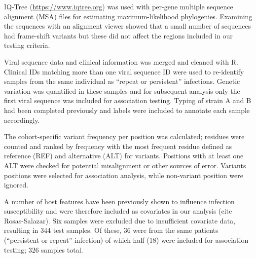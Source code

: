 \documentclass{article}
\begin{document}
IQ-Tree 
(\url{https://www.iqtree.org})
\cite{nguyen2015iq}
was used with per-gene multiple sequence alignment (MSA) files for estimating maximum-likelihood phylogenies.
Examining the sequences with an alignment viewer showed that a small number of sequences had frame-shift variants but these did not affect the regions included in our testing criteria.

Viral sequence data and clinical information was merged and cleaned with R.
Clinical IDs matching more than one viral sequence ID were used to re-identify samples from the same individual as ``repeat or persistent'' infections. 
Genetic variation was quantified in these samples and for subsequent analysis only the first viral sequence was included for association testing. 
Typing of strain A and B had been completed previously and labels were included to annotate each sample accordingly.

The cohort-specific variant frequency per position was calculated;
residues were counted and ranked by frequency
with the most frequent residue defined as reference (REF) and alternative (ALT) for variants.
Positions with at least one ALT were checked for potential misalignment or other sources of error. 
Variants positions were selected for association analysis, while non-variant position were ignored.

A number of host features have been previously shown to influence infection susceptibility and were therefore included as covariates in our analysis (cite Rosas-Salazar).
Six samples were excluded due to insufficient covariate data, resulting in 344 test samples. 
Of these, 36 were from the same patients (``persistent or repeat'' infection) of which half (18) were included for association testing; 326 samples total.
\end{document}
